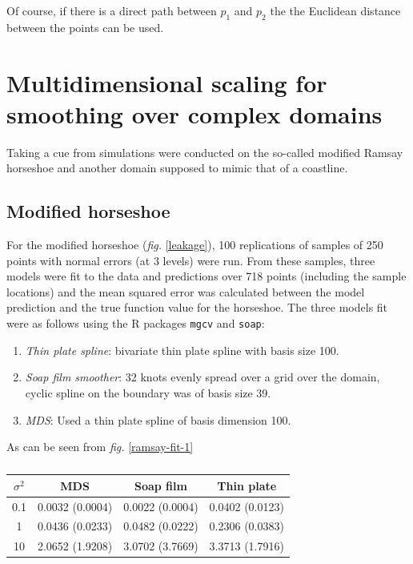 \documentclass[a4paper,10pt]{article}
\newcommand{\fig}[1]{\emph{fig.} \ref{#1}}
\begin{document}
Of course, if there is a direct path between $p_1$ and $p_2$ the the Euclidean distance between the points can be used.

\section{Multidimensional scaling for smoothing over complex domains}

Taking a cue from \cite{soap} simulations were conducted on the so-called modified Ramsay horseshoe and another domain supposed to mimic that of a coastline.

\subsection{Modified horseshoe}

For the modified horseshoe (\fig{leakage}), 100 replications of samples of 250 points with normal errors (at 3 levels) were run. From these samples, three models were fit to the data and predictions over 718 points (including the sample locations) and the mean squared error was calculated between the model prediction and the true function value for the horseshoe. The three models fit were as follows using the \textsf{R} packages \texttt{mgcv} and \texttt{soap}:

\begin{enumerate}
\item \emph{Thin plate spline}: bivariate thin plate spline with basis size 100.
\item \emph{Soap film smoother}: 32 knots evenly spread over a grid over the domain, cyclic spline on the boundary was of basis size 39.
\item \emph{MDS}: Used a thin plate spline of basis dimension 100.
\end{enumerate} 

As can be seen from \fig{ramsay-fit-1}

\begin{table}[ht]
\centering
\begin{tabular}{c || c c c}
$\sigma^2$ & MDS & Soap film & Thin plate\\ 
\hline
0.1  & 0.0032 (0.0004) & 0.0022 (0.0004) & 0.0402 (0.0123)\\ 
1  & 0.0436 (0.0233) & 0.0482 (0.0222) & 0.2306 (0.0383)\\ 
10  & 2.0652 (1.9208) & 3.0702 (3.7669) & 3.3713 (1.7916)\\ 
\end{tabular}
\label{ramsayresultstable}
\caption{}
\end{table}
\end{document}
